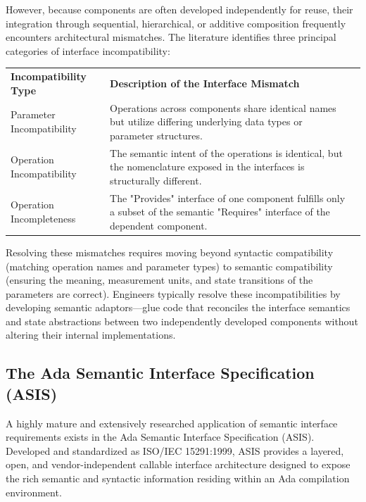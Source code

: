 \documentclass[11pt,letterpaper]{article}
\newcommand{\headingfont}{\sffamily}
\begin{document}
\begin{multicols*}{2}
However, because components are often developed independently for reuse, their integration through sequential, hierarchical, or additive composition frequently encounters architectural mismatches. The literature identifies three principal categories of interface incompatibility:

\begingroup
\renewcommand{\arraystretch}{1.5}
\begin{tabularx}{\columnwidth}{@{}P{0.3\columnwidth}YY@{}}
    \headingfont\bfseries Incompatibility Type & \headingfont\bfseries Description of the Interface Mismatch \\
    \addlinespace[4pt]
    Parameter Incompatibility & Operations across components share identical names but utilize differing underlying data types or parameter structures. \\
    \addlinespace[4pt]
    Operation Incompatibility & The semantic intent of the operations is identical, but the nomenclature exposed in the interfaces is structurally different. \\
    \addlinespace[4pt]
    Operation Incompleteness & The "Provides" interface of one component fulfills only a subset of the semantic "Requires" interface of the dependent component. \\
\end{tabularx}
\label{tab:table2}
\endgroup
Resolving these mismatches requires moving beyond syntactic compatibility (matching operation names and parameter types) to semantic compatibility (ensuring the meaning, measurement units, and state transitions of the parameters are correct). Engineers typically resolve these incompatibilities by developing semantic adaptors—glue code that reconciles the interface semantics and state abstractions between two independently developed components without altering their internal implementations.

\subsection{The Ada Semantic Interface Specification (ASIS)}
A highly mature and extensively researched application of semantic interface requirements exists in the Ada Semantic Interface Specification (ASIS). Developed and standardized as ISO/IEC 15291:1999, ASIS provides a layered, open, and vendor-independent callable interface architecture designed to expose the rich semantic and syntactic information residing within an Ada compilation environment.


\end{multicols*}
\end{document}
